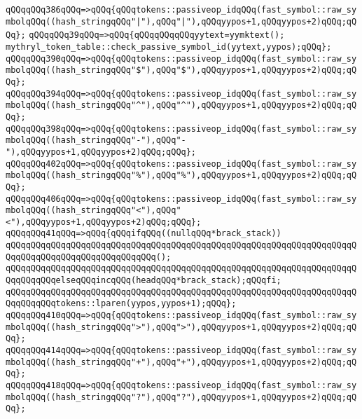 \verb|qQQqqQQq386qQQq=>qQQq{qQQqtokens::passiveop_idqQQq(fast_symbol::raw_symbolqQQq((hash_stringqQQq"|\verb#|"),qQQq"|"),qQQqyypos+1,qQQqyypos+2)qQQq;qQQq};#\newline
\verb|qQQqqQQq39qQQq=>qQQq{qQQqqQQqqQQqyytext=yymktext();|\newline
\verb|mythryl_token_table::check_passive_symbol_id(yytext,yypos);qQQq};|\newline
\verb|qQQqqQQq390qQQq=>qQQq{qQQqtokens::passiveop_idqQQq(fast_symbol::raw_symbolqQQq((hash_stringqQQq"$"),qQQq"$"),qQQqyypos+1,qQQqyypos+2)qQQq;qQQq};|\newline
\verb|qQQqqQQq394qQQq=>qQQq{qQQqtokens::passiveop_idqQQq(fast_symbol::raw_symbolqQQq((hash_stringqQQq"^"),qQQq"^"),qQQqyypos+1,qQQqyypos+2)qQQq;qQQq};|\newline
\verb|qQQqqQQq398qQQq=>qQQq{qQQqtokens::passiveop_idqQQq(fast_symbol::raw_symbolqQQq((hash_stringqQQq"-"),qQQq"-"),qQQqyypos+1,qQQqyypos+2)qQQq;qQQq};|\newline
\verb|qQQqqQQq402qQQq=>qQQq{qQQqtokens::passiveop_idqQQq(fast_symbol::raw_symbolqQQq((hash_stringqQQq"%"),qQQq"%"),qQQqyypos+1,qQQqyypos+2)qQQq;qQQq};|\newline
\verb|qQQqqQQq406qQQq=>qQQq{qQQqtokens::passiveop_idqQQq(fast_symbol::raw_symbolqQQq((hash_stringqQQq"<"),qQQq"<"),qQQqyypos+1,qQQqyypos+2)qQQq;qQQq};|\newline
\verb|qQQqqQQq41qQQq=>qQQq{qQQqifqQQq((nullqQQq*brack_stack))|\newline
\verb|qQQqqQQqqQQqqQQqqQQqqQQqqQQqqQQqqQQqqQQqqQQqqQQqqQQqqQQqqQQqqQQqqQQqqQQqqQQqqQQqqQQqqQQqqQQqqQQqqQQq();|\newline
\verb|qQQqqQQqqQQqqQQqqQQqqQQqqQQqqQQqqQQqqQQqqQQqqQQqqQQqqQQqqQQqqQQqqQQqqQQqqQQqqQQqelseqQQqincqQQq(headqQQq*brack_stack);qQQqfi;|\newline
\verb|qQQqqQQqqQQqqQQqqQQqqQQqqQQqqQQqqQQqqQQqqQQqqQQqqQQqqQQqqQQqqQQqqQQqqQQqqQQqqQQqtokens::lparen(yypos,yypos+1);qQQq};|\newline
\verb|qQQqqQQq410qQQq=>qQQq{qQQqtokens::passiveop_idqQQq(fast_symbol::raw_symbolqQQq((hash_stringqQQq">"),qQQq">"),qQQqyypos+1,qQQqyypos+2)qQQq;qQQq};|\newline
\verb|qQQqqQQq414qQQq=>qQQq{qQQqtokens::passiveop_idqQQq(fast_symbol::raw_symbolqQQq((hash_stringqQQq"+"),qQQq"+"),qQQqyypos+1,qQQqyypos+2)qQQq;qQQq};|\newline
\verb|qQQqqQQq418qQQq=>qQQq{qQQqtokens::passiveop_idqQQq(fast_symbol::raw_symbolqQQq((hash_stringqQQq"?"),qQQq"?"),qQQqyypos+1,qQQqyypos+2)qQQq;qQQq};|\newline
